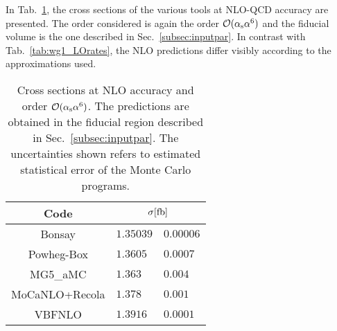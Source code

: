 In Tab.~\ref{tab:wg1_NLOrates}, the cross sections of the various tools at NLO-QCD accuracy are presented.
The order considered is again the order $\mathcal{O}(\alpha_{\rm s}\alpha^6)$ and the fiducial volume is the one described in Sec.~\ref{subsec:inputpar}.
In contrast with Tab.~\ref{tab:wg1_LOrates}, the NLO predictions differ visibly according to the approximations used.

\begin{table}[h!]
    \centering
    \begin{tabular}{c|r@{ $\pm$ }l}
      Code  &  \multicolumn{2}{c}{$\sigma[\rm{fb}]$}  \\
        \hline
        \hline
        {\sc Bonsay}  &  $1.35039$ & $0.00006$  \\
        {\sc Powheg-Box}  &  $1.3605\phantom{0}$  & $0.0007$   \\
        {\sc MG5\_aMC}&  $1.363\phantom{0}\phantom{0}$ & $0.004$  \\
        {\sc MoCaNLO+Recola}  &  $ 1.378\phantom{0}\phantom{0}$ & $0.001$ \\
        {\sc VBFNLO}  &  $1.3916\phantom{0}$ & $0.0001$  \\
    \end{tabular}
    \caption{\label{tab:wg1_NLOrates} Cross sections at NLO accuracy and order $\mathcal{O}(\alpha_\text{s}\alpha^6)$.
    The predictions are obtained in the fiducial region described in Sec.~\ref{subsec:inputpar}.
    The uncertainties shown refers to estimated statistical error of the Monte Carlo programs.}
\end{table}

